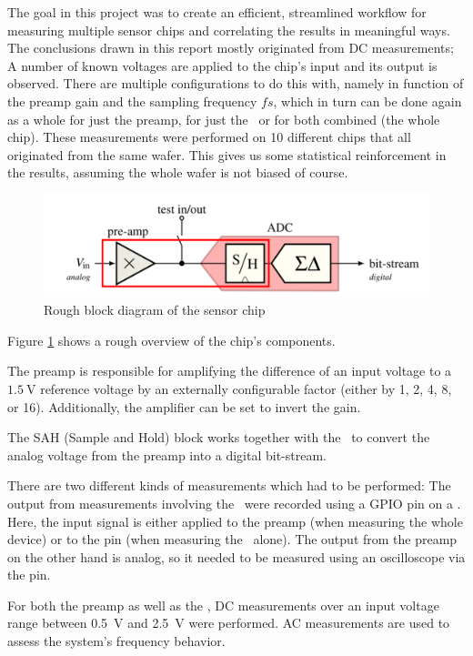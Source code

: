 The goal in this project was  to create an efficient, streamlined workflow for
measuring  multiple sensor  chips and  correlating the  results in  meaningful
ways.   The  conclusions  drawn  in  this report  mostly  originated  from  DC
measurements; A number  of known voltages are applied to  the chip's input and
its output  is observed. There  are multiple configurations  to do  this with,
namely in function  of the preamp gain and the  sampling frequency $fs$, which
in turn can be done again as a whole for just the preamp, for just the \sdm~or
for both  combined (the whole  chip). These measurements were performed  on 10
different chips that  all originated from the same wafer.   This gives us some
statistical  reinforcement in  the results,  assuming the  whole wafer  is not
biased of course.

\begin{figure}[t]
    \centering
    \includegraphics[width=.8\linewidth]{images/blockdiagram.png}
    \caption{Rough block diagram of the sensor chip}
    \label{fig:blockdiagram}
\end{figure}

Figure \ref{fig:blockdiagram} shows a rough overview of the chip's components.

The preamp is responsible for amplifying the difference of an input voltage to
a  $\SI{1.5}{\volt}$ reference voltage by an  externally  configurable  factor
(either  by  1,  2,  4,  8,  or 16). Additionally, the amplifier can be set to
invert the gain.

The SAH  (Sample and Hold) block  works together with the  \sdm~to convert the
analog voltage from the preamp into a digital bit-stream.

There are two different  kinds  of measurements which had to be performed: The
output from measurements involving the \sdm~were recorded using  a GPIO pin on
a  \raspi.  Here,  the  input  signal  is  either  applied to the preamp (when
measuring the whole  device)  or  to the  pin (when measuring
the \sdm~alone). The output from the preamp on the other hand is analog, so it
needed to  be  measured  using  an oscilloscope via the  pin.

For both the preamp as well as the \sdm, DC measurements over an input voltage
range   between   \SI{0.5}{\volt}  and  \SI{2.5}{\volt}  were  performed.   AC
measurements  are  used   to   assess   the   system's   frequency   behavior.

